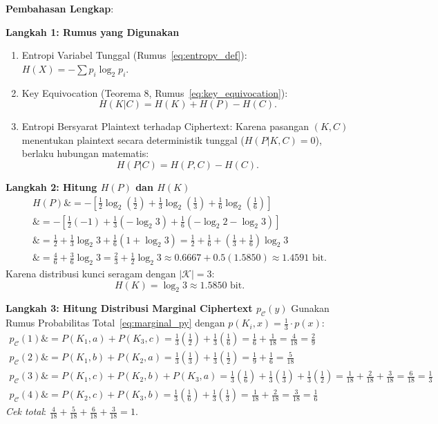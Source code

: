 \documentclass[11pt,a4paper]{article}
\begin{document}
\noindent\textbf{Pembahasan Lengkap}:

\noindent\textbf{Langkah 1: Rumus yang Digunakan}
\begin{enumerate}
    \item Entropi Variabel Tunggal (Rumus~\eqref{eq:entropy_def}): $H(X) = -\sum p_i \log_2 p_i$.
    \item Key Equivocation (Teorema 8, Rumus~\eqref{eq:key_equivocation}):
    \[
    H(K|C) = H(K) + H(P) - H(C).
    \]
    \item Entropi Bersyarat Plaintext terhadap Ciphertext:
    Karena pasangan $(K, C)$ menentukan plaintext secara deterministik tunggal ($H(P|K, C) = 0$), berlaku hubungan matematis:
    \[
    H(P|C) = H(P, C) - H(C).
    \]
\end{enumerate}

\noindent\textbf{Langkah 2: Hitung $H(P)$ dan $H(K)$}
\begin{align*}
H(P) \&= - \left[ \frac{1}{2}\log_2\left(\frac{1}{2}\right) + \frac{1}{3}\log_2\left(\frac{1}{3}\right) + \frac{1}{6}\log_2\left(\frac{1}{6}\right) \right] \\
\&= - \left[ \frac{1}{2}(-1) + \frac{1}{3}(-\log_2 3) + \frac{1}{6}(-\log_2 2 - \log_2 3) \right] \\
\&= \frac{1}{2} + \frac{1}{3}\log_2 3 + \frac{1}{6}(1 + \log_2 3) = \frac{1}{2} + \frac{1}{6} + \left(\frac{1}{3} + \frac{1}{6}\right)\log_2 3 \\
\&= \frac{4}{6} + \frac{3}{6}\log_2 3 = \frac{2}{3} + \frac{1}{2}\log_2 3 \approx 0.6667 + 0.5(1.5850) \approx 1.4591 \text{ bit}.
\end{align*}
Karena distribusi kunci seragam dengan $|\mathcal{K}| = 3$:
\[
H(K) = \log_2 3 \approx 1.5850 \text{ bit}.
\]

\noindent\textbf{Langkah 3: Hitung Distribusi Marginal Ciphertext $p_{\mathcal{C}}(y)$}
Gunakan Rumus Probabilitas Total~\eqref{eq:marginal_py} dengan $p(K_i, x) = \frac{1}{3} \cdot p(x)$:
\begin{align*}
p_{\mathcal{C}}(1) \&= P(K_1, a) + P(K_3, c) = \frac{1}{3}\left(\frac{1}{2}\right) + \frac{1}{3}\left(\frac{1}{6}\right) = \frac{1}{6} + \frac{1}{18} = \frac{4}{18} = \frac{2}{9} \\
p_{\mathcal{C}}(2) \&= P(K_1, b) + P(K_2, a) = \frac{1}{3}\left(\frac{1}{3}\right) + \frac{1}{3}\left(\frac{1}{2}\right) = \frac{1}{9} + \frac{1}{6} = \frac{5}{18} \\
p_{\mathcal{C}}(3) \&= P(K_1, c) + P(K_2, b) + P(K_3, a) = \frac{1}{3}\left(\frac{1}{6}\right) + \frac{1}{3}\left(\frac{1}{3}\right) + \frac{1}{3}\left(\frac{1}{2}\right) = \frac{1}{18} + \frac{2}{18} + \frac{3}{18} = \frac{6}{18} = \frac{1}{3} \\
p_{\mathcal{C}}(4) \&= P(K_2, c) + P(K_3, b) = \frac{1}{3}\left(\frac{1}{6}\right) + \frac{1}{3}\left(\frac{1}{3}\right) = \frac{1}{18} + \frac{2}{18} = \frac{3}{18} = \frac{1}{6}
\end{align*}
\textit{Cek total}: $\frac{4}{18} + \frac{5}{18} + \frac{6}{18} + \frac{3}{18} = 1$.
\end{document}
